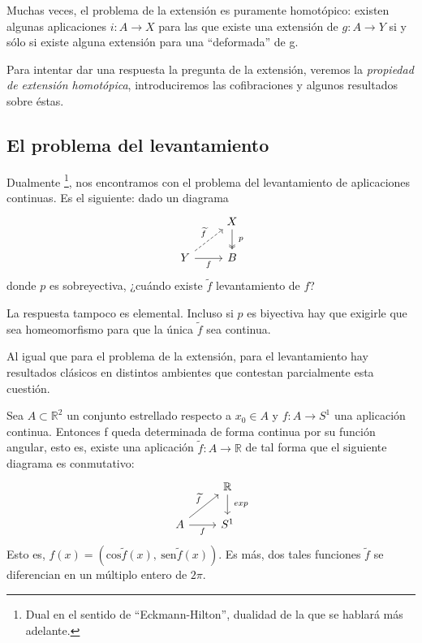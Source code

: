 Muchas veces, el problema de la extensión es puramente homotópico: existen algunas aplicaciones $i : A \longrightarrow X$ para las que existe una extensión de $g : A \longrightarrow Y$ si y sólo si existe alguna extensión para una ``deformada'' de g. \par 
Para intentar dar una respuesta la pregunta de la extensión, veremos la \textit{propiedad de extensión homotópica}, introduciremos las cofibraciones y algunos resultados sobre éstas. \par

%


\subsection*{El problema del levantamiento}\label{c1:lev}
Dualmente \footnote{Dual en el sentido de ``Eckmann-Hilton'', dualidad de la que se hablará más adelante.},
nos encontramos con el problema del levantamiento de aplicaciones continuas. Es el siguiente: dado un diagrama
$$
\begin{tikzcd}
	{}	& X \dar[two heads]{\ p} \\
	Y \urar[dashed]{\tilde{f}} \rar[swap]{f} & B
\end{tikzcd}
$$
donde $p$ es sobreyectiva, ¿cuándo existe $\tilde{f}$ levantamiento de $f$?\par 
La respuesta tampoco es elemental. Incluso si $p$ es biyectiva hay que exigirle que sea homeomorfismo para que la única $\tilde{f}$ sea continua.\par

Al igual que para el problema de la extensión, para el levantamiento hay resultados clásicos en distintos ambientes que contestan parcialmente esta cuestión.

\begin{teorf} 
Sea $A \subset \mathbb{R}^2$ un conjunto estrellado respecto a $x_{0} \in A$ y $f : A \longrightarrow S^{1}$ una aplicación continua. Entonces f queda determinada de forma continua por su función angular, esto es, existe una aplicación $\tilde{f} : A \longrightarrow \mathbb{R}$ de tal forma que el siguiente diagrama es conmutativo:
$$
\begin{tikzcd}
	{}	& \mathbb{R} \dar{\ exp} \\
	A \urar{\tilde{f}} \rar[swap]{f} & S^1
\end{tikzcd}
$$
Esto es, $f(x) = \left(\text{cos}\tilde{f}(x), \ \text{sen}\tilde{f}(x) \right)$. Es más, dos tales funciones $\tilde{f}$ se diferencian en un múltiplo entero de $2\pi$.
\end{teorf}


